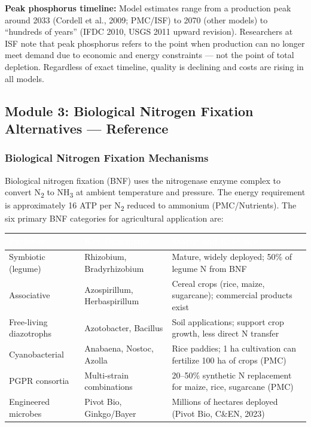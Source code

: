 \documentclass[11pt,letterpaper]{article}
\newcommand{\tableheader}[1]{\textbf{\sffamily\textcolor{white}{#1}}}
\begin{document}
\textbf{Peak phosphorus timeline:} Model estimates range from a production peak around 2033 (Cordell et al., 2009; PMC/ISF) to 2070 (other models) to ``hundreds of years'' (IFDC 2010, USGS 2011 upward revision). Researchers at ISF note that peak phosphorus refers to the point when production can no longer meet demand due to economic and energy constraints --- not the point of total depletion. Regardless of exact timeline, quality is declining and costs are rising in all models.

\subsection{Module 3: Biological Nitrogen Fixation Alternatives --- Reference}

\subsubsection{Biological Nitrogen Fixation Mechanisms}

Biological nitrogen fixation (BNF) uses the nitrogenase enzyme complex to convert N\textsubscript{2} to NH\textsubscript{3} at ambient temperature and pressure. The energy requirement is approximately 16 ATP per N\textsubscript{2} reduced to ammonium (PMC/Nutrients). The six primary BNF categories for agricultural application are:

\begin{center}
\begin{tabularx}{\textwidth}{L{3.5cm}L{3.5cm}X}
\toprule
{}
\tableheader{Pathway} & \tableheader{Key Organisms} & \tableheader{Status and Evidence} \\
\midrule
Symbiotic (legume) & Rhizobium, Bradyrhizobium & Mature, widely deployed; 50\% of legume N from BNF \\
Associative & Azospirillum, Herbaspirillum & Cereal crops (rice, maize, sugarcane); commercial products exist \\
Free-living diazotrophs & Azotobacter, Bacillus & Soil applications; support crop growth, less direct N transfer \\
Cyanobacterial & Anabaena, Nostoc, Azolla & Rice paddies; 1 ha cultivation can fertilize 100 ha of crops (PMC) \\
PGPR consortia & Multi-strain combinations & 20--50\% synthetic N replacement for maize, rice, sugarcane (PMC) \\
Engineered microbes & Pivot Bio, Ginkgo/Bayer & Millions of hectares deployed (Pivot Bio, C\&EN, 2023) \\
\bottomrule
\end{tabularx}
\end{center}
\end{document}
